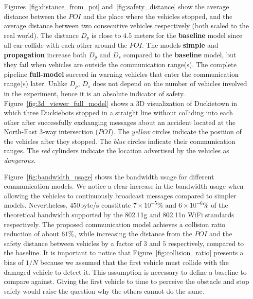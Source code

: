 Figures~\ref{fig:distance_from_poi} and~\ref{fig:safety_distance} show the average distance 
between the $POI$ and the place where the vehicles stopped, and the average distance 
between two consecutive vehicles respectively (both scaled to the real world).
The distance $D_p$ is close to $4.5$ meters for the \textbf{baseline} model since all car collide with each
other around the $POI$. The models \textbf{simple} and \textbf{propagation} increase both
$D_p$ and $D_s$ compared to the \textbf{baseline} model, but they fail when vehicles are outside the communication range(s).
The complete pipeline \textbf{full-model} succeed in warning vehicles that enter the communication range(s) later.
Unlike $D_p$, $D_s$ does not depend on the number of vehicles involved in the experiment, hence it
is an absolute indicator of safety. Figure~\ref{fig:3d_viewer_full_model} shows a 3D visualization of Duckietown
in which three Duckiebots stopped in a straight line without colliding into each other
after successfully exchanging messages about an accident located at the North-East 3-way intersection ($POI$).
The \textit{yellow} circles indicate the position of the vehicles after they stopped.
The \textit{blue} circles indicate their communication ranges. The \textit{red} cylinders
indicate the location advertised by the vehicles as \textit{dangerous}.

Figure~\ref{fig:bandwidth_usage} shows the bandwidth usage for different communication models.
We notice a clear increase in the bandwidth usage when allowing the vehicles to continuously broadcast messages
compared to simpler models. Nevertheless, $450$byte/s constitute $7 \times 10^{-5}\%$ and
$6 \times 10^{-6}\%$ of the theoretical bandwidth supported by the 802.11g and 802.11n WiFi standards respectively.
The proposed communication model achieves a collision ratio reduction of about $\collision_ratio_reduction_perc\%$,
while increasing the distance from the $POI$ and the safety distance between vehicles by a factor of
$3$ and $5$ respectively, compared to the baseline.
It is important to notice that Figure~\ref{fig:collision_ratio} presents a bias of $1/N$ because we assumed that
the first vehicle must collide with the damaged vehicle to detect it. This assumption is necessary to define a
baseline to compare against. Giving the first vehicle to time to perceive the obstacle and stop safely would
raise the question why the others cannot do the same.
